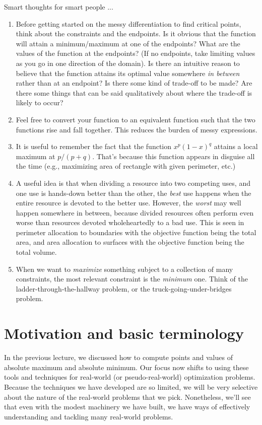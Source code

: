 \documentclass[10pt]{amsart}
\begin{document}
Smart thoughts for smart people ...

\begin{enumerate}
\item Before getting started on the messy differentiation to find
  critical points, think about the constraints and the endpoints. Is
  it obvious that the function will attain a minimum/maximum at one of
  the endpoints? What are the values of the function at the endpoints?
  (If no endpoints, take limiting values as you go in one direction of
  the domain). Is there an intuitive reason to believe that the
  function attains its optimal value somewhere {\em in between} rather
  than at an endpoint? Is there some kind of trade-off to be made? Are
  there some things that can be said qualitatively about where the
  trade-off is likely to occur?
\item Feel free to convert your function to an equivalent function
  such that the two functions rise and fall together. This reduces the
  burden of messy expressions.
\item It is useful to remember the fact that the function $x^p(1 -
  x)^q$ attains a local maximum at $p/(p + q)$. That's because this
  function appears in disguise all the time (e.g., maximizing area of
  rectangle with given perimeter, etc.)
\item A useful idea is that when dividing a resource into two
  competing uses, and one use is hands-down better than the other, the
  {\em best} use happens when the entire resource is devoted to the
  better use. However, the {\em worst} may well happen somewhere in
  between, because divided resources often perform even worse than
  resources devoted wholeheartedly to a bad use. This is seen in
  perimeter allocation to boundaries with the objective function being
  the total area, and area allocation to surfaces with the objective
  function being the total volume.
\item When we want to {\em maximize} something subject to a collection
  of many constraints, the most relevant constraint is the {\em
  minimum} one. Think of the ladder-through-the-hallway problem, or
  the truck-going-under-bridges problem. 
\end{enumerate}

\section{Motivation and basic terminology}

In the previous lecture, we discussed how to compute points and values
of absolute maximum and absolute minimum. Our focus now shifts to
using these tools and techniques for real-world (or pseudo-real-world)
optimization problems. Because the techniques we have developed are so
limited, we will be very selective about the nature of the real-world
problems that we pick. Nonetheless, we'll see that even with the
modest machinery we have built, we have ways of effectively
understanding and tackling many real-world problems.
\end{document}
